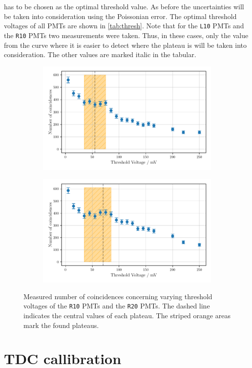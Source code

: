 has to be chosen as the optimal threshold value. As before the uncertainties will be taken 
into consideration using the Poissonian error. The optimal threshold voltages of all PMTs are shown in 
\autoref{tab:thresh}.
Note that for the \texttt{L10} PMTs and the \texttt{R10} PMTs two measurements 
were taken. Thus, in these cases, only the value from the curve where it is easier to detect
where the plateau is will be taken into consideration.
The other values are marked italic in the tabular.
\begin{figure}
    \centering
    \begin{subfigure}[b]{0.48\textwidth}
    \includegraphics[width=\textwidth]{plots/threshR20.pdf}
\end{subfigure}\hfill
\begin{subfigure}[b]{0.48\textwidth}
    \includegraphics[width=\textwidth]{plots/threshR10.pdf}
\end{subfigure}
\caption{Measured number of coincidences concerning varying threshold voltages
of the \texttt{R10} PMTs and the \texttt{R20} PMTs.
The dashed line indicates the central values of each plateau. The striped orange areas mark the found plateaus.}
\label{fig:threshR10R20}
\end{figure}
\section{TDC callibration}
